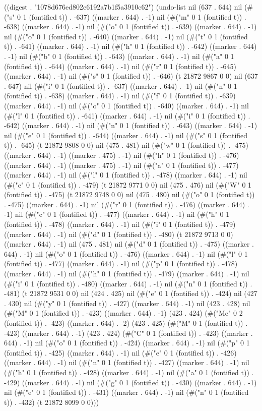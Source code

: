 
((digest . "1078d676ed802e6192a7b1f5a3910c62") (undo-list nil (637 . 644) nil (#("s" 0 1 (fontified t)) . -637) ((marker . 644) . -1) nil (#("m" 0 1 (fontified t)) . -638) ((marker . 644) . -1) nil (#("o" 0 1 (fontified t)) . -639) ((marker . 644) . -1) nil (#("o" 0 1 (fontified t)) . -640) ((marker . 644) . -1) nil (#("t" 0 1 (fontified t)) . -641) ((marker . 644) . -1) nil (#("h" 0 1 (fontified t)) . -642) ((marker . 644) . -1) nil (#("b" 0 1 (fontified t)) . -643) ((marker . 644) . -1) nil (#("a" 0 1 (fontified t)) . -644) ((marker . 644) . -1) nil (#("r" 0 1 (fontified t)) . -645) ((marker . 644) . -1) nil (#("s" 0 1 (fontified t)) . -646) (t 21872 9867 0 0) nil (637 . 647) nil (#("i" 0 1 (fontified t)) . -637) ((marker . 644) . -1) nil (#("n" 0 1 (fontified t)) . -638) ((marker . 644) . -1) nil (#("f" 0 1 (fontified t)) . -639) ((marker . 644) . -1) nil (#("o" 0 1 (fontified t)) . -640) ((marker . 644) . -1) nil (#("l" 0 1 (fontified t)) . -641) ((marker . 644) . -1) nil (#("i" 0 1 (fontified t)) . -642) ((marker . 644) . -1) nil (#("n" 0 1 (fontified t)) . -643) ((marker . 644) . -1) nil (#("e" 0 1 (fontified t)) . -644) ((marker . 644) . -1) nil (#("s" 0 1 (fontified t)) . -645) (t 21872 9808 0 0) nil (475 . 481) nil (#("w" 0 1 (fontified t)) . -475) ((marker . 644) . -1) ((marker . 475) . -1) nil (#("h" 0 1 (fontified t)) . -476) ((marker . 644) . -1) ((marker . 475) . -1) nil (#("a" 0 1 (fontified t)) . -477) ((marker . 644) . -1) nil (#("l" 0 1 (fontified t)) . -478) ((marker . 644) . -1) nil (#("e" 0 1 (fontified t)) . -479) (t 21872 9771 0 0) nil (475 . 476) nil (#("W" 0 1 (fontified t)) . -475) (t 21872 9748 0 0) nil (475 . 480) nil (#("o" 0 1 (fontified t)) . -475) ((marker . 644) . -1) nil (#("r" 0 1 (fontified t)) . -476) ((marker . 644) . -1) nil (#("c" 0 1 (fontified t)) . -477) ((marker . 644) . -1) nil (#("h" 0 1 (fontified t)) . -478) ((marker . 644) . -1) nil (#("i" 0 1 (fontified t)) . -479) ((marker . 644) . -1) nil (#("d" 0 1 (fontified t)) . -480) (t 21872 9713 0 0) ((marker . 644) . -1) nil (475 . 481) nil (#("d" 0 1 (fontified t)) . -475) ((marker . 644) . -1) nil (#("o" 0 1 (fontified t)) . -476) ((marker . 644) . -1) nil (#("l" 0 1 (fontified t)) . -477) ((marker . 644) . -1) nil (#("p" 0 1 (fontified t)) . -478) ((marker . 644) . -1) nil (#("h" 0 1 (fontified t)) . -479) ((marker . 644) . -1) nil (#("i" 0 1 (fontified t)) . -480) ((marker . 644) . -1) nil (#("n" 0 1 (fontified t)) . -481) (t 21872 9531 0 0) nil (424 . 425) nil (#("e" 0 1 (fontified t)) . -424) nil (427 . 430) nil (#("y" 0 1 (fontified t)) . -427) ((marker . 644) . -1) nil (423 . 428) nil (#("M" 0 1 (fontified t)) . -423) ((marker . 644) . -1) (423 . 424) (#("Me" 0 2 (fontified t)) . -423) ((marker . 644) . -2) (423 . 425) (#("M" 0 1 (fontified t)) . -423) ((marker . 644) . -1) (423 . 424) (#("C" 0 1 (fontified t)) . -423) ((marker . 644) . -1) nil (#("o" 0 1 (fontified t)) . -424) ((marker . 644) . -1) nil (#("p" 0 1 (fontified t)) . -425) ((marker . 644) . -1) nil (#("e" 0 1 (fontified t)) . -426) ((marker . 644) . -1) nil (#("n" 0 1 (fontified t)) . -427) ((marker . 644) . -1) nil (#("h" 0 1 (fontified t)) . -428) ((marker . 644) . -1) nil (#("a" 0 1 (fontified t)) . -429) ((marker . 644) . -1) nil (#("g" 0 1 (fontified t)) . -430) ((marker . 644) . -1) nil (#("e" 0 1 (fontified t)) . -431) ((marker . 644) . -1) nil (#("n" 0 1 (fontified t)) . -432) (t 21872 8099 0 0)))
